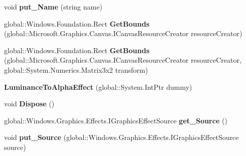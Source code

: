 \begin{DoxyCompactItemize}
void {\bfseries put\+\_\+\+Name} (string name)
\item 
\mbox{\label{class_microsoft_1_1_graphics_1_1_canvas_1_1_effects_1_1_luminance_to_alpha_effect_a3e7eeaa07b2936a2ce93f317a126962e}} 
global\+::\+Windows.\+Foundation.\+Rect {\bfseries Get\+Bounds} (global\+::\+Microsoft.\+Graphics.\+Canvas.\+I\+Canvas\+Resource\+Creator resource\+Creator)
\item 
\mbox{\label{class_microsoft_1_1_graphics_1_1_canvas_1_1_effects_1_1_luminance_to_alpha_effect_ad5cb5e950c30b07d3ea03eaa4c460a4f}} 
global\+::\+Windows.\+Foundation.\+Rect {\bfseries Get\+Bounds} (global\+::\+Microsoft.\+Graphics.\+Canvas.\+I\+Canvas\+Resource\+Creator resource\+Creator, global\+::\+System.\+Numerics.\+Matrix3x2 transform)
\item 
\mbox{\label{class_microsoft_1_1_graphics_1_1_canvas_1_1_effects_1_1_luminance_to_alpha_effect_a9d29e122dde9d7d9a316dd3ede498668}} 
{\bfseries Luminance\+To\+Alpha\+Effect} (global\+::\+System.\+Int\+Ptr dummy)
\item 
\mbox{\label{class_microsoft_1_1_graphics_1_1_canvas_1_1_effects_1_1_luminance_to_alpha_effect_a85340fa4f5ed911e337aa537dbdb858b}} 
void {\bfseries Dispose} ()
\item 
\mbox{\label{class_microsoft_1_1_graphics_1_1_canvas_1_1_effects_1_1_luminance_to_alpha_effect_a4e49df080f648a6f85452c155c52125c}} 
global\+::\+Windows.\+Graphics.\+Effects.\+I\+Graphics\+Effect\+Source {\bfseries get\+\_\+\+Source} ()
\item 
\mbox{\label{class_microsoft_1_1_graphics_1_1_canvas_1_1_effects_1_1_luminance_to_alpha_effect_a7e09359a7b7b056a5f57bd696445520c}} 
void {\bfseries put\+\_\+\+Source} (global\+::\+Windows.\+Graphics.\+Effects.\+I\+Graphics\+Effect\+Source source)
\item 

\end{DoxyCompactItemize}
